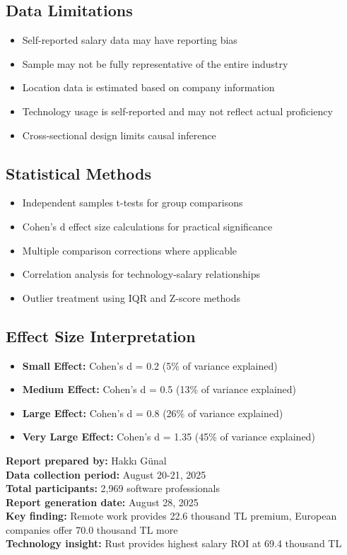 \documentclass[12pt,a4paper]{article}
\begin{document}
\subsection{Data Limitations}
\begin{itemize}
    \item Self-reported salary data may have reporting bias
    \item Sample may not be fully representative of the entire industry
    \item Location data is estimated based on company information
    \item Technology usage is self-reported and may not reflect actual proficiency
    \item Cross-sectional design limits causal inference
\end{itemize}

\subsection{Statistical Methods}
\begin{itemize}
    \item Independent samples t-tests for group comparisons
    \item Cohen's d effect size calculations for practical significance
    \item Multiple comparison corrections where applicable
    \item Correlation analysis for technology-salary relationships
    \item Outlier treatment using IQR and Z-score methods
\end{itemize}

\subsection{Effect Size Interpretation}
\begin{itemize}
    \item \textbf{Small Effect:} Cohen's d = 0.2 (5\% of variance explained)
    \item \textbf{Medium Effect:} Cohen's d = 0.5 (13\% of variance explained)
    \item \textbf{Large Effect:} Cohen's d = 0.8 (26\% of variance explained)
    \item \textbf{Very Large Effect:} Cohen's d = 1.35 (45\% of variance explained)
\end{itemize}

\vspace{2cm}

\begin{center}
\textbf{Report prepared by:} Hakkı Günal\\
\textbf{Data collection period:} August 20-21, 2025\\
\textbf{Total participants:} 2,969 software professionals\\
\textbf{Report generation date:} August 28, 2025\\
\textbf{Key finding:} Remote work provides 22.6 thousand TL premium, European companies offer 70.0 thousand TL more\\
\textbf{Technology insight:} Rust provides highest salary ROI at 69.4 thousand TL
\end{center}
\end{document}
